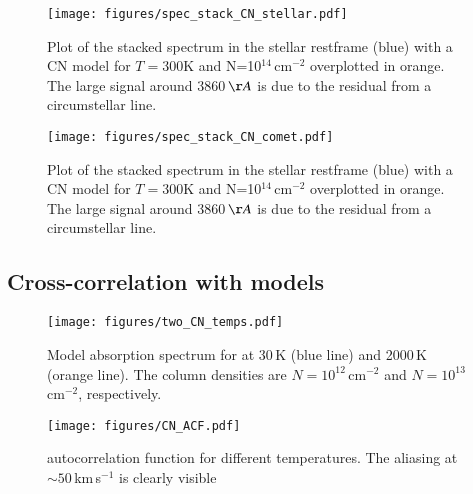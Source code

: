 \documentclass{aa}
\begin{document}
\begin{figure}
    \begin{centering}
        \texttt{[image: figures/spec\_stack\_CN\_stellar.pdf]}
        \caption{Plot of the stacked spectrum in the stellar restframe (blue) with a CN model for $T=$300K and N=10$^{14}$\,cm$^{-2}$ overplotted in orange. The large signal around 3860\,$\AA$ is due to the residual from a circumstellar  line.}
        \label{fig:spec_CN_stellar_frame}
    \end{centering}
\end{figure}


\begin{figure}
    \begin{centering}
        \texttt{[image: figures/spec\_stack\_CN\_comet.pdf]}
        \caption{Plot of the stacked spectrum in the stellar restframe (blue) with a CN model for $T=$300K and N=10$^{14}$\,cm$^{-2}$ overplotted in orange. The large signal around 3860\,$\AA$ is due to the residual from a circumstellar  line.}
        \label{fig:spec_CN_comet_frame}
    \end{centering}
\end{figure}


\subsection{Cross-correlation with  models}\label{sect:CCF}


\begin{figure}
    \begin{centering}
        \texttt{[image: figures/two\_CN\_temps.pdf]}
        \caption{Model absorption spectrum for  at 30\,K (blue line) and 2000\,K (orange line). The  column densities are $N=10^{12}$\,cm$^{-2}$ and $N=10^{13}$\,cm$^{-2}$, respectively. }
        \label{fig:CN_theory}
    \end{centering}
\end{figure}

\begin{figure}
    \begin{centering}
        \texttt{[image: figures/CN\_ACF.pdf]}
        \caption{ autocorrelation function for different temperatures. The aliasing at $\sim50$\,km\,s$^{-1}$ is clearly visible}
        \label{fig:CN_ACF}
    \end{centering}
\end{figure}
\end{document}
